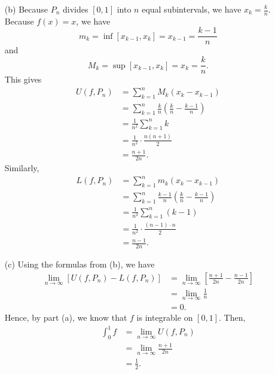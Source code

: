 \documentclass[11pt,letterpaper]{article}
\begin{document}
\begin{enumerate}
    
    \item[(b)] Because $P_n$ divides $[0,1]$ into $n$ equal subintervals, we have $x_k = \frac{k}{n}$. Because $f(x)=x$, we have \[ m_k=\inf [x_{k-1},x_k] = x_{k-1} = \frac{k-1}{n} \]    
    and
    \[ M_k=\sup [x_{k-1},x_k] = x_k = \frac{k}{n}. \]
    This gives
    \begin{align*}
        U(f,P_n) &= \sum_{k=1}^n M_k(x_k-x_{k-1}) \\
        &= \sum_{k=1}^n \frac{k}{n} \left(\frac{k}{n}-\frac{k-1}{n} \right) \\
        &= \frac{1}{n^2} \sum_{k=1}^n k \\
        &= \frac{1}{n^2} \cdot \frac{n(n+1)}{2} \\
        &= \frac{n+1}{2n}.
    \end{align*}
    Similarly,
    \begin{align*}
        L(f,P_n) &= \sum_{k=1}^n m_k(x_k-x_{k-1}) \\
        &= \sum_{k=1}^n \frac{k-1}{n} \left(\frac{k}{n}-\frac{k-1}{n} \right) \\
        &= \frac{1}{n^2} \sum_{k=1}^n (k-1) \\
        &= \frac{1}{n^2} \cdot \frac{(n-1)\cdot n}{2} \\
        &= \frac{n-1}{2n}.
    \end{align*}
    \item[(c)] Using the formulas from (b), we have
    \begin{align*}
        \lim_{n\rightarrow \infty} [ U(f,P_n) - L(f,P_n) ]
        &= \lim_{n\rightarrow \infty} \left[ \frac{n+1}{2n} - \frac{n-1}{2n} \right] \\
        &= \lim_{n\rightarrow \infty} \frac{1}{n} \\
        &= 0.
    \end{align*}
    Hence, by part (a), we know that $f$ is integrable on $[0,1]$. Then,
    \begin{align*}
        \int_0^1 f &= \lim_{n\rightarrow\infty} U(f,P_n) \\
        &= \lim_{n\rightarrow\infty} \frac{n+1}{2n} \\
        &= \frac{1}{2}.
    \end{align*}
\end{enumerate}
\end{document}
